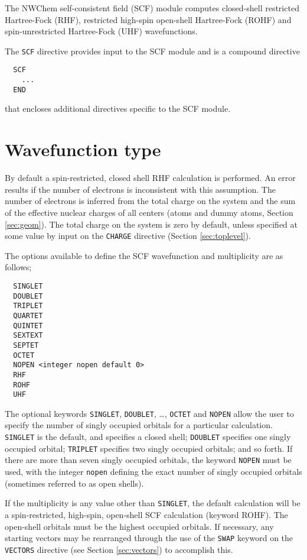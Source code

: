 \label{sec:scf}

The NWChem self-consistent field (SCF) module computes closed-shell
restricted Hartree-Fock (RHF), restricted high-spin open-shell
Hartree-Fock (ROHF) and spin-unrestricted Hartree-Fock (UHF)
wavefunctions. 

The \verb+SCF+ directive provides input to the SCF module
and is a compound directive
\begin{verbatim}
  SCF
    ...
  END
\end{verbatim}
that encloses additional directives specific to the SCF module. 

\section{Wavefunction type}

By default a spin-restricted, closed shell RHF calculation is
performed.  An error results if the number of electrons is
inconsistent with this assumption.  The number of electrons is
inferred from the total charge on the system and the sum of the
effective nuclear charges of all centers (atoms and dummy atoms,
Section \ref{sec:geom}).  The total charge on the system is zero by
default, unless specified at some value by input on the \verb+CHARGE+
directive (Section \ref{sec:toplevel}).

The options available to define the SCF wavefunction and multiplicity
are as follows;

\begin{verbatim}
  SINGLET 
  DOUBLET 
  TRIPLET 
  QUARTET 
  QUINTET 
  SEXTEXT
  SEPTET
  OCTET
  NOPEN <integer nopen default 0>
  RHF
  ROHF
  UHF
\end{verbatim}

The optional keywords \verb+SINGLET+, \verb+DOUBLET+, \ldots,
\verb+OCTET+ and \verb+NOPEN+ allow the user to specify the number of
singly occupied orbitals for a particular calculation.  \verb+SINGLET+
is the default, and specifies a closed shell; \verb+DOUBLET+ specifies
one singly occupied orbital; \verb+TRIPLET+ specifies two singly
occupied orbitals; and so forth.  If there are more than seven singly
occupied orbitals, the keyword \verb+NOPEN+ must be used, with the
integer \verb+nopen+ defining the exact number of singly occupied
orbitals (sometimes referred to as open shells).

If the multiplicity is any value other than \verb+SINGLET+, the
default calculation will be a spin-restricted, high-spin, open-shell
SCF calculation (keyword ROHF).  The open-shell orbitals must be the
highest occupied orbitals.  If necessary, any starting vectors may be
rearranged through the use of the \verb+SWAP+ keyword on the
\verb+VECTORS+ directive (see Section \ref{sec:vectors}) to accomplish
this.


